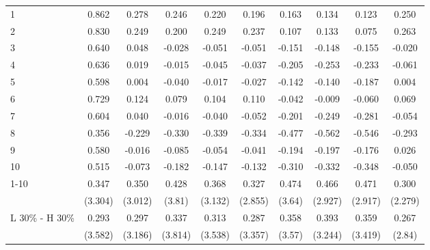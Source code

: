 \begin{tabular}{lccccccccc}
\midrule
1       & 0.862   & 0.278   & 0.246   & 0.220   & 0.196   & 0.163   & 0.134   & 0.123   & 0.250 \\
2       & 0.830   & 0.249   & 0.200   & 0.249   & 0.237   & 0.107   & 0.133   & 0.075   & 0.263 \\
3       & 0.640   & 0.048   & -0.028  & -0.051  & -0.051  & -0.151  & -0.148  & -0.155  & -0.020 \\
4       & 0.636   & 0.019   & -0.015  & -0.045  & -0.037  & -0.205  & -0.253  & -0.233  & -0.061 \\
5       & 0.598   & 0.004   & -0.040  & -0.017  & -0.027  & -0.142  & -0.140  & -0.187  & 0.004 \\
6       & 0.729   & 0.124   & 0.079   & 0.104   & 0.110   & -0.042  & -0.009  & -0.060  & 0.069 \\
7       & 0.604   & 0.040   & -0.016  & -0.040  & -0.052  & -0.201  & -0.249  & -0.281  & -0.054 \\
8       & 0.356   & -0.229  & -0.330  & -0.339  & -0.334  & -0.477  & -0.562  & -0.546  & -0.293 \\
9       & 0.580   & -0.016  & -0.085  & -0.054  & -0.041  & -0.194  & -0.197  & -0.176  & 0.026 \\
10      & 0.515   & -0.073  & -0.182  & -0.147  & -0.132  & -0.310  & -0.332  & -0.348  & -0.050 \\
\midrule
\multirow{2}[1]{*}{1-10} & 0.347   & 0.350   & 0.428   & 0.368   & 0.327   & 0.474   & 0.466   & 0.471   & 0.300 \\
        & (3.304) & (3.012) & (3.81)  & (3.132) & (2.855) & (3.64)  & (2.927) & (2.917) & (2.279) \\
\multicolumn{1}{l}{\multirow{2}[1]{*}{L 30\% - H 30\%}} & 0.293   & 0.297   & 0.337   & 0.313   & 0.287   & 0.358   & 0.393   & 0.359   & 0.267 \\
        & (3.582) & (3.186) & (3.814) & (3.538) & (3.357) & (3.57)  & (3.244) & (3.419) & (2.84) \\
\bottomrule
\bottomrule
\end{tabular}%
